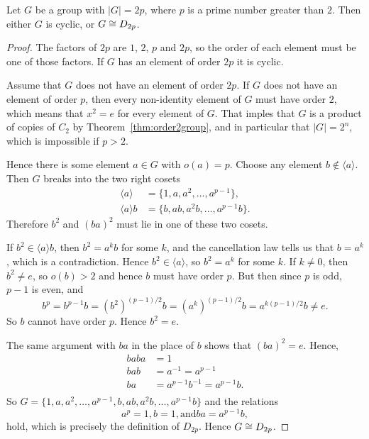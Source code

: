 \begin{proposition}
  Let $G$ be a group with $|G| = 2p$, where $p$ is a prime number
  greater than $2$.  Then either $G$ is cyclic, or $G \cong D_{2p}$.
\end{proposition}
\begin{proof}
  The factors of $2p$ are $1$, $2$, $p$ and $2p$, so the order of each
  element must be one of those factors.  If $G$ has an element of
  order $2p$ it is cyclic.
  
  Assume that $G$ does not have an element of order $2p$.  If $G$ does
  not have an element of order $p$, then every non-identity element of
  $G$ must have order $2$, which means that $x^{2} = e$ for every
  element of $G$.  That imples that $G$ is a product of copies of 
  $C_{2}$ by Theorem~\ref{thm:order2group}, and in particular that 
  $|G| = 2^{n}$, which is impossible if $p > 2$.
  
  Hence there is some element $a \in G$ with $o(a) = p$.  Choose any
  element $b \notin \langle a \rangle$.  Then $G$ breaks into the two
  right cosets
  \begin{align*}
    \langle a \rangle &= \{1, a, a^{2}, \ldots, a^{p-1}\}, \\
    \langle a \rangle b &= \{b, ab, a^{2}b, \ldots, a^{p-1}b\}.
  \end{align*}
  Therefore $b^{2}$ and $(ba)^{2}$ must lie in one of these two cosets.
  
  If $b^{2} \in \langle a \rangle b$, then $b^{2} = a^{k}b$ for some 
  $k$, and the cancellation law tells us that $b = a^{k}$, which is a 
  contradiction.  Hence $b^{2} \in \langle a \rangle$, so $b^{2} = 
  a^{k}$ for some $k$.  If $k \ne 0$, then $b^{2} \ne e$, so $o(b) > 2$ 
  and hence $b$ must have order $p$.  But then since $p$ is odd, $p-1$ 
  is even, and
  \[
    b^{p} = b^{p-1}b = (b^{2})^{(p-1)/2}b = (a^{k})^{(p-1)/2}b = 
    a^{k(p-1)/2}b \ne e.
  \]
  So $b$ cannot have order $p$.  Hence $b^{2} = e$.
  
  The same argument with $ba$ in the place of $b$ shows that $(ba)^{2} = 
  e$.  Hence,
  \begin{align*}
    baba &= 1 \\
    bab &= a^{-1} = a^{p-1} \\
      ba &= a^{p-1}b^{-1} = a^{p-1}b.\\
  \end{align*}
  So $G = \{ 1, a, a^{2}, \ldots, a^{p-1}, b, ab, a^{2}b, \ldots, a^{p-1}b\}$
  and the relations
  \[
    a^{p} = 1, b = 1, \text{and} ba = a^{p-1}b,
  \]
  hold, which is precisely the definition of $D_{2p}$.  Hence $G \cong D_{2p}$.
\end{proof}

